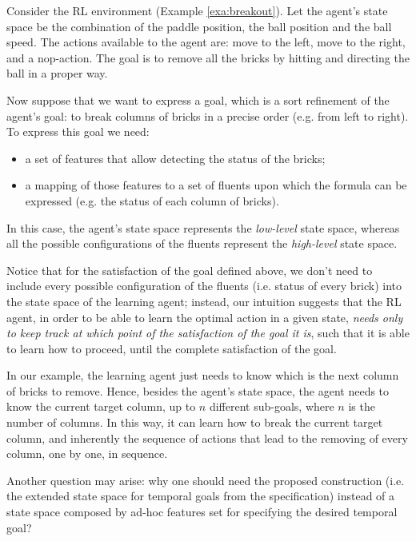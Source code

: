 \begin{example}
	Consider the RL environment \Breakout (Example \ref{exa:breakout}). Let the agent's state space be the combination of the paddle position, the ball position and the ball speed. The actions available to the agent are: move to the left, move to the right, and a nop-action. The goal is to remove all the bricks by hitting and directing the ball in a proper way.
	
	Now suppose that we want to express a \LLf goal, which is a sort refinement of the agent's goal: to break columns of bricks in a precise order (e.g. from left to right). To express this goal we need:
	\begin{itemize}
		\item a set of features that allow detecting the status of the bricks;
		\item a mapping of those features to a set of fluents upon which the \LLf formula can be expressed (e.g. the status of each column of bricks).
	\end{itemize}
	In this case, the agent's state space represents the \emph{low-level} state space, whereas all the possible configurations of the fluents represent the \emph{high-level} state space.
	
	Notice that for the satisfaction of the \LLf goal defined above, we don't need to include every possible configuration of the fluents (i.e. status of every brick) into the state space of the learning agent; instead, our intuition suggests that the RL agent, in order to be able to learn the optimal action in a given state, \emph{needs only to keep track at which point of the satisfaction of the goal it is}, such that it is able to learn how to proceed, until the complete satisfaction of the goal.
	
	In our example, the learning agent just needs to know which is the next column of bricks to remove. Hence, besides the agent's state space, the agent needs to know the current target column, up to $n$ different sub-goals, where $n$ is the number of columns. In this way, it can learn how to break the current target column, and inherently the sequence of actions that lead to the removing of every column, one by one, in sequence.
	
	Another question may arise: why one should need the proposed construction (i.e. the extended state space for temporal goals from the  \LLf specification) instead of a state space composed by ad-hoc features set for specifying the desired temporal goal?
	

\end{example}
